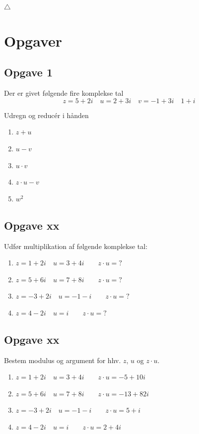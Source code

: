 \documentclass[a4paper, 12pt,titlepage]{article}
\begin{document}
\hfill \(\triangle\)

\newpage

\section{Opgaver}
\label{sec:org1456264}
\subsection*{Opgave 1}
\label{sec:org95f72bd}
Der er givet følgende fire komplekse tal
$$z=5+2i \quad u = 2+3i \quad v = -1 + 3i \quad 1+i$$

Udregn og reducér i hånden
\begin{enumerate}
\item \(z+u\)
\item \(u-v\)
\item \(u \cdot v\)
\item \(z \cdot u - v\)
\item \(w^2\)
\end{enumerate}
\subsection*{Opgave xx}
\label{sec:org9861ab1}
Udfør multiplikation af følgende komplekse tal:

\begin{enumerate}
\item \(z=1 +2i \quad u=3 + 4i \qquad z\cdot u =?\)
\item \(z=5 +6i \quad u=7 + 8i \qquad z\cdot u =?\)
\item \(z=-3 +2i \quad u=-1 -i \qquad z\cdot u =?\)
\item \(z=4 -2i \quad u=i \qquad z\cdot u =?\)
\end{enumerate}


\subsection*{Opgave xx}
\label{sec:orgb6d491b}
Bestem modulus og argument for hhv. \(z\), \(u\) og \(z \cdot u\).

\begin{enumerate}
\item \(z=1 +2i \quad u=3 + 4i \qquad z\cdot u =-5 + 10i\)
\item \(z=5 +6i \quad u=7 + 8i \qquad z\cdot u =-13 +82i\)
\item \(z=-3 +2i \quad u=-1 -i \qquad z\cdot u = 5 +i\)
\item \(z=4 -2i \quad u=i \qquad z\cdot u =2 + 4i\)
\end{enumerate}
\end{document}
